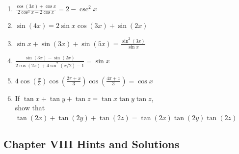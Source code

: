\documentclass[english]{book}
\begin{document}
\begin{enumerate}
\begin{enumerate}
    \item $\frac{\cos (3x) + \cos x}{2 \cos^{3} x - 2 \cos x} = 2 - \csc^{2} x$
    \item $\sin (4x) = 2 \sin x \cos (3x) + \sin (2x)$
    \item $\sin x + \sin (3x) + \sin (5x) = \frac{\sin^{2} (3x)}{\sin x}$
    \item $\frac{ \sin (3x) - \sin (2x) }{ 2 \cos (2x) +4 \sin^{2} (x/2) - 1 } = \sin x$
    \item $4 \cos (\frac{x}{3}) \cos (\frac{2\pi+x}{3}) \cos (\frac{4 \pi+x}{3}) = \cos x$
    \item If $\tan x + \tan y + \tan z = \tan x \tan y \tan z$, \\
          show that $\tan(2x) + \tan(2y) + \tan(2z) = \tan(2x) \tan(2y) \tan(2z)$
  \end{enumerate}

\end{enumerate}


\newpage
\begin{center}
\section*{Chapter VIII Hints and Solutions}
\end{center}
\end{document}
